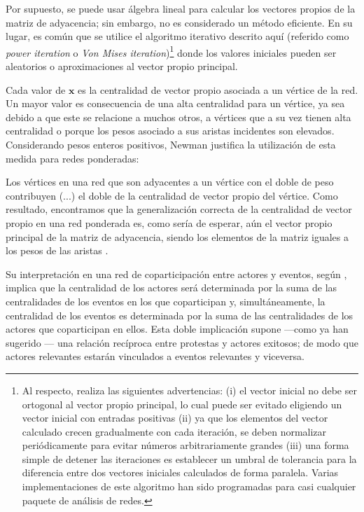 \documentclass[letterpaper, 11pt]{book}
\theoremstyle{definition}
\theoremstyle{remark}
\begin{document}
Por supuesto, se puede usar álgebra lineal para calcular los vectores propios de la matriz de adyacencia; sin embargo, no es considerado un método eficiente. 
En su lugar, es común que se utilice el algoritmo iterativo descrito aquí (referido como \emph{power iteration} o \emph{Von Mises iteration})\footnote{
    Al respecto, \citet{2010_Newman_Networks} realiza las siguientes advertencias: 
    (i) el vector inicial no debe ser ortogonal al vector propio principal, lo cual puede ser evitado eligiendo un vector inicial con entradas positivas 
    (ii) ya que los elementos del vector calculado crecen gradualmente con cada iteración, se deben normalizar periódicamente para evitar números arbitrariamente grandes 
    (iii) una forma simple de detener las iteraciones es establecer un umbral de tolerancia para la diferencia entre dos vectores iniciales calculados de forma paralela. 
    Varias implementaciones de este algoritmo han sido programadas para casi cualquier paquete de análisis de redes.
} donde los valores iniciales pueden ser aleatorios o aproximaciones al vector propio principal. 


Cada valor de $\mathbf{x}$ es la centralidad de vector propio asociada a un vértice de la red. 
Un mayor valor es consecuencia de una alta centralidad para un vértice, ya sea debido a que este se relacione a muchos otros, a vértices que a su vez tienen alta centralidad o porque los pesos asociado a sus aristas incidentes son elevados. 
Considerando pesos enteros positivos, Newman justifica la utilización de esta medida para redes ponderadas:

\begin{center}
    \begin{minipage}{0.9\linewidth}
        {\setlength{\parindent}{12pt}\small
        Los vértices en una red que son adyacentes a un vértice con el doble de peso contribuyen 
        (...) el doble de la centralidad de vector propio del vértice. 
        Como resultado, encontramos que la generalización correcta de la centralidad de vector propio en una red ponderada es, como sería de esperar, aún el vector propio principal de la matriz de adyacencia, siendo los elementos de la matriz iguales a los pesos de las aristas \normalsize \citep[2]{2004_Newman_WeightedNet}.
        }
    \end{minipage}
\end{center}



Su interpretación en una red de coparticipación entre actores y eventos, según \citet{1997_Borgatti_2ModeSNA}, implica que la centralidad de los actores será determinada por la suma de las centralidades de los eventos en los que coparticipan y, simultáneamente, la centralidad de los eventos es determinada por la suma de las centralidades de los actores que coparticipan en ellos. 
Esta doble implicación supone ---como ya han sugerido \citet{1993_BrmanEvtt_StructureSocialProtest}--- una relación recíproca entre protestas y actores exitosos; de modo que actores relevantes estarán vinculados a eventos relevantes y viceversa.
\end{document}
